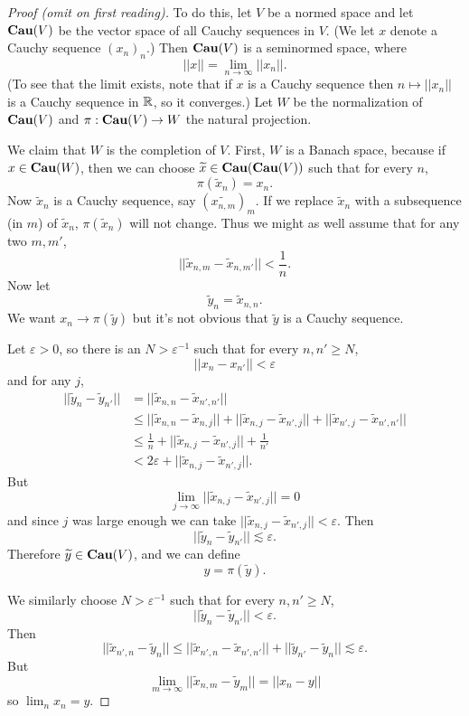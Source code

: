 \begin{proof}[Proof (omit on first reading)]
To do this, let $V$ be a normed space and let $\mathbf{Cau} (V)$ be the vector space of all Cauchy sequences in $V$.
(We let $x$ denote a Cauchy sequence ${(x_{n})}_{n}$.)
Then $\mathbf{Cau} (V)$ is a seminormed space, where
\[||x|| = \lim_{n \to \infty} ||x_{n}||.\]
(To see that the limit exists, note that if $x$ is a Cauchy sequence then $n \mapsto ||x_{n}||$ is a Cauchy sequence in $\mathbb{R}$, so it converges.)
Let $W$ be the normalization of $\mathbf{Cau} (V)$ and $\pi: \mathbf{Cau} (V) \to W$ the natural projection.

We claim that $W$ is the completion of $V$.
First, $W$ is a Banach space, because if $x \in \mathbf{Cau} (W)$, then we can choose $\widetilde{x} \in \mathbf{Cau} (\mathbf{Cau} (V))$ such that for every $n$,
\[\pi(\widetilde{x}_{n}) = x_{n}.\]
Now $\widetilde{x}_{n}$ is a Cauchy sequence, say ${(\widetilde{x_{n,m}})}_{m}$. If we replace $\widetilde{x}_{n}$ with a subsequence (in $m$) of $\widetilde{x}_{n}$, $\pi(\widetilde{x}_{n})$ will not change.
Thus we might as well assume that for any two $m,m'$,
\[||\widetilde{x}_{n,m} - \widetilde{x}_{n,m'}|| < \frac{1}{n}.\]
Now let
\[\widetilde{y}_{n} = \widetilde{x}_{n,n}.\]
We want $x_{n} \to \pi(\widetilde{y})$ but it's not obvious that $\widetilde{y}$ is a Cauchy sequence.

Let $\varepsilon > 0$, so there is an $N > \varepsilon^{-1}$ such that for every $n, n' \geq N$,
\[||x_{n} - x_{n'}|| < \varepsilon\]
and for any $j$,
\begin{align*}
  ||\widetilde{y}_{n} - \widetilde{y}_{n'}|| &= ||\widetilde{x}_{n,n} - \widetilde{x}_{n',n'}||\\
  &\leq ||\widetilde{x}_{n,n} - \widetilde{x}_{n,j}|| + ||\widetilde{x}_{n,j} - \widetilde{x}_{n',j}|| + ||\widetilde{x}_{n',j} - \widetilde{x}_{n',n'}||\\
  &\leq \frac{1}{n} + ||\widetilde{x}_{n,j} - \widetilde{x}_{n',j}|| + \frac{1}{n'}\\
  &< 2\varepsilon + ||\widetilde{x}_{n,j} - \widetilde{x}_{n',j}||.
\end{align*}
But
\[\lim_{j \to \infty} ||\widetilde{x}_{n,j} - \widetilde{x}_{n',j}|| = 0\]
and since $j$ was large enough we can take $||\widetilde{x}_{n,j} - \widetilde{x}_{n',j}|| < \varepsilon$. Then
\[||\widetilde{y}_{n} - \widetilde{y}_{n'}|| \lesssim \varepsilon.\]
Therefore $\widetilde{y} \in \mathbf{Cau} (V)$, and we can define
\[y = \pi(\widetilde{y}).\]

We similarly choose $N > \varepsilon^{-1}$ such that for every $n, n' \geq N$,
\[||\widetilde{y}_{n} - \widetilde{y}_{n'}|| < \varepsilon.\]
Then
\[||\widetilde{x}_{n',n} - \widetilde{y}_{n}|| \leq ||\widetilde{x}_{n',n} - \widetilde{x}_{n',n'}|| + ||\widetilde{y}_{n'} - \widetilde{y}_{n}|| \lesssim \varepsilon.\]
But
\[\lim_{m \to \infty} ||\widetilde{x}_{n,m} - \widetilde{y}_{m}|| = ||x_{n} - y||\]
so $\lim_{n} x_{n} = y$.


\end{proof}
